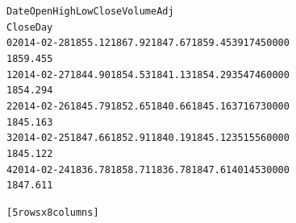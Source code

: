 \documentclass[letterpaper,10pt,english]{/Users/edwsurewin/anaconda/lib/python2.7/site-packages/sphinx/texinputs/sphinxhowto}
\newenvironment{InvisibleVerbatim}
        {\begin{mdframed}[leftmargin=0.1\linewidth,innerleftmargin=3pt,innerrightmargin=3pt, userdefinedwidth=1\linewidth, linewidth=0pt, linecolor=white, usetwoside=false]}
        {\end{mdframed}}
\begin{document}
\fi
    

        
        

            
                \begin{InvisibleVerbatim}
                \vspace{-0.5\baselineskip}
\begin{alltt}         Date     Open     High      Low    Close      Volume  Adj
Close Day
0  2014-02-28  1855.12  1867.92  1847.67  1859.45  3917450000
1859.45   5
1  2014-02-27  1844.90  1854.53  1841.13  1854.29  3547460000
1854.29   4
2  2014-02-26  1845.79  1852.65  1840.66  1845.16  3716730000
1845.16   3
3  2014-02-25  1847.66  1852.91  1840.19  1845.12  3515560000
1845.12   2
4  2014-02-24  1836.78  1858.71  1836.78  1847.61  4014530000
1847.61   1

[5 rows x 8 columns]
\end{alltt}

            \end{InvisibleVerbatim}
            
        
 \iffalse


\end{document}
